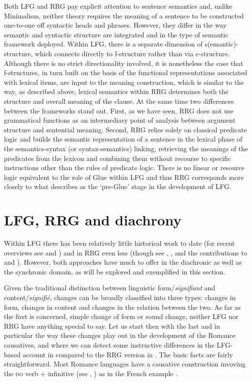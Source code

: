 \documentclass[output=paper,hidelinks]{langscibook}
\begin{document}
Both LFG and RRG pay explicit attention to sentence semantics and, unlike Minimalism, neither theory requires the meaning of a sentence to be constructed one-to-one off syntactic heads and phrases. However, they differ in the way semantic and syntactic structure are integrated and in the type of semantic framework deployed. Within LFG, there is a separate dimension of s(emantic)-structure, which connects directly to f-structure rather than via c-structure. Although there is no strict directionality involved, it is nonetheless the case that f-structures, in turn built on the basis of the functional representations associated with lexical items, are input to the meaning construction, which is similar to the way, as described above, lexical semantics within RRG determines both the structure and overall meaning of the clause. At the same time two differences between the frameworks stand out. First, as we have seen, RRG does not use grammatical functions as an intermediary point of analysis between argument structure and sentential meaning. Second, RRG relies solely on classical predicate logic and builds the semantic representation of a sentence in the lexical phase of the semantics-syntax (or syntax-semantics) linking, retrieving the meanings of the predicates from the lexicon and combining them without recourse to specific instructions other than the rules of predicate logic. There is no linear or resource logic equivalent to the role of Glue within LFG and thus RRG corresponds more closely to what \citet[346]{findlay2021} describes as the ‘pre-Glue’ stage in the development of LFG.

\newpage
\section{LFG, RRG and diachrony}
\label{sec:RRG:4}

Within LFG there has been relatively little historical work to date (for recent overviews see \citealt{borjars2017lexical} and ) and in RRG even less (though see \citealt{Ohori1992}, \citealt{Eschenberg2005}, and the contributions to \citealt{Kailuweit2008b} and \citealt{Matasovic2022}). However, both approaches have much to offer in the diachronic as well as the synchronic domain, as will be explored and exemplified in this section.

Given the traditional distinction between linguistic form/\textit{signifiant} and content/\textit{signifié}, changes can be broadly classified into three types: changes in form, changes in content and changes in the relation between the two. As far as the first is concerned, simple change of form or sound change, neither LFG nor RRG have anything special to say. Let us start then with the last and in particular the way these changes play out in the development of the Romance causatives, and where we can detect some instructive differences in the LFG-based account in \citet[651-655]{borjars2017lexical} compared to the RRG version in \citet[79-83]{Kailuweit2008}. The basic facts are fairly straightforward. Most Romance languages have a causative construction invoving the \textsc{do} verb + infinitive (see \citealt{Labelle2017}, ) as in the French example .
\end{document}
